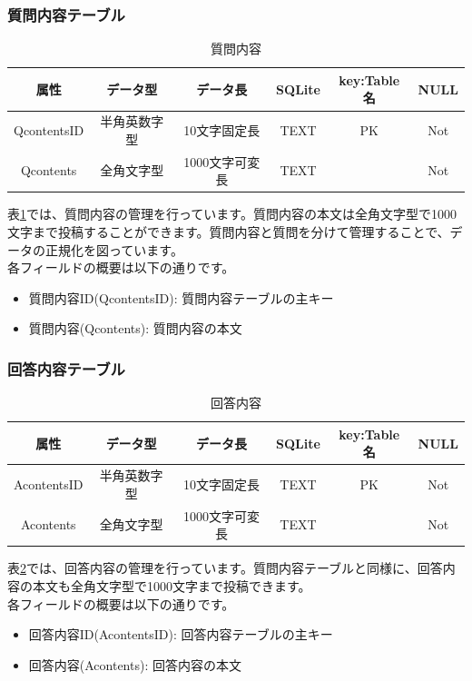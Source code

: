 \documentclass[a4j]{jarticle}
\begin{document}
\subsubsection{質問内容テーブル}
\begin{table}[H]
    \caption{質問内容}
    \label{tbl: qcontents}
    \begin{center}
        \begin{tabular}{|c|c|c|c|c|c|} \hline
           属性 & データ型 & データ長 & SQLite & key:Table名 & NULL\\ \hline \hline
            QcontentsID & 半角英数字型 & 10文字固定長 & TEXT & PK & Not\\ \hline
            Qcontents & 全角文字型 & 1000文字可変長 & TEXT & & Not\\ \hline
        \end{tabular}
    \end{center}
\end{table}
表\ref{tbl: qcontents}では、質問内容の管理を行っています。質問内容の本文は全角文字型で1000文字まで投稿することができます。質問内容と質問を分けて管理することで、データの正規化を図っています。\\
各フィールドの概要は以下の通りです。
\begin{itemize}
  \item 質問内容ID(QcontentsID):
  質問内容テーブルの主キー
  \item 質問内容(Qcontents):
  質問内容の本文
\end{itemize}

\subsubsection{回答内容テーブル}
\begin{table}[H]
    \caption{回答内容}
    \label{tbl: acontents}
    \begin{center}
        \begin{tabular}{|c|c|c|c|c|c|} \hline
            属性 & データ型 & データ長 & SQLite & key:Table名 & NULL\\ \hline \hline
            AcontentsID & 半角英数字型 & 10文字固定長 & TEXT & PK & Not\\ \hline
            Acontents & 全角文字型 & 1000文字可変長 & TEXT & & Not\\ \hline
        \end{tabular}
    \end{center}
\end{table}
表\ref{tbl: acontents}では、回答内容の管理を行っています。質問内容テーブルと同様に、回答内容の本文も全角文字型で1000文字まで投稿できます。\\
各フィールドの概要は以下の通りです。
\begin{itemize}
  \item 回答内容ID(AcontentsID):
  回答内容テーブルの主キー
  \item 回答内容(Acontents):
  回答内容の本文
\end{itemize}
\end{document}
